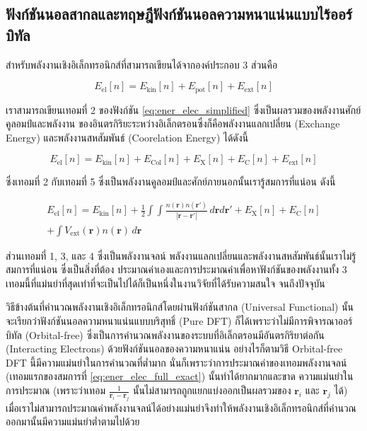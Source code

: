 \subsection{ฟังก์ชันนอลสากลและทฤษฎีฟังก์ชันนอลความหนาแน่นแบบไร้ออร์บิทัล}
\label{ssec:univer_functional}

สำหรับพลังงานเชิงอิเล็กทรอนิกส์ที่สามารถเขียนได้จากองค์ประกอบ 3 ส่วนคือ

\begin{equation}\label{eq:ener_elec_simplified}
    E_{\text{el}}[n] = E_{\text{kin}}[n] + E_{\text{pot}}[n] + E_{\text{ext}}[n]
\end{equation}

\noindent เราสามารถเขียนเทอมที่ 2 ของฟังก์ชัน \ref{eq:ener_elec_simplified} ซึ่งเป็นผลรวมของพลังงานศักย์คูลอมป์และพลังงาน%
ของอินตรกิริยะระหว่างอิเล็กตรอนซึ่งก็คือพลังงานแลกเปลี่ยน (Exchange Energy) และพลังงานสหสัมพันธ์ (Coorelation Energy) ได้ดังนี้

\begin{equation}\label{eq:ener_elec_full}
    E_{\text{el}}[n] = E_{\text{kin}}[n] + E_{\text{Col}}[n] + E_{\text{X}}[n] + E_{\text{C}}[n] + 
    E_{\text{ext}}[n]
\end{equation}

\noindent ซึ่งเทอมที่ 2 กับเทอมที่ 5 ซึ่งเป็นพลังงานคูลอมป์และศักย์ภายนอกนั้นเรารู้สมการที่แน่อน ดังนี้

\begin{multline}\label{eq:ener_elec_full_exact}
    E_{\text{el}}[n] = E_{\text{kin}}[n] + \frac{1}{2} \int \int \frac{n(\bm{r})n(\bm{r'})}{|\bm{r}-\bm{r'}|} 
    \, d\bm{r} d\bm{r'} + E_{\text{X}}[n] + E_{\text{C}}[n] \\ 
    + \int V_{\text{ext}}(\bm{r}) n(\bm{r}) \, d\bm{r}
\end{multline}

\noindent ส่วนเทอมที่ 1, 3, และ 4 ซึ่งเป็นพลังงานจลน์ พลังงานแลกเปลี่ยนและพลังงานสหสัมพันธ์นั้นเราไม่รู้สมการที่แน่อน ซึ่งเป็นสิ่งที่ต้อง%
ประมาณค่าเองและการประมาณค่าเพื่อหาฟังก์ชันของพลังงานทั้ง 3 เทอมนี้ที่แม่นยำที่สุดเท่าที่จะเป็นไปได้ก็เป็นหนึ่งในงานวิจัยที่ได้รับความสนใจ%
จนถึงปัจจุบัน

วิธีข้างต้นที่คำนวณพลังงานเชิงอิเล็กทรอนิกส์โดยผ่านฟังก์ชันสากล (Universal Functional) นั้นจะเรียกว่าฟังก์ชันนอลความหนาแน่นแบบบริสุทธิ์ 
(Pure DFT) ก็ได้เพราะว่าไม่มีการพิจารณาออร์บิทัล (Orbital-free) ซึ่งเป็นการคำนวณพลังงานของระบบที่อิเล็กตรอนมีอันตรกิริยาต่อกัน 
(Interacting Electrons) ด้วยฟังก์ชันนอลของความหนาแน่น อย่างไรก็ตามวิธี Orbital-free DFT นี้มีความแม่นยำในการคำนวณที่ต่ำมาก%
นั่นก็เพราะว่าการประมาณค่าของเทอมพลังงานจลน์ (เทอมแรกของสมการที่ \ref{eq:ener_elec_full_exact}) นั้นทำได้ยากมากและขาด%
ความแม่นยำในการประมาณ (เพราะว่าเทอม $\frac{1}{\bm{r}_{i}-\bm{r}_{j}}$ นั้นไม่สามารถถูกแยกแบ่งออกเป็นผลรวมของ 
$\bm{r}_{i}$ และ $\bm{r}_{j}$ ได้)  เมื่อเราไม่สามารถประมาณค่าพลังงานจลน์ได้อย่างแม่นยำจึงทำให้พลังงานเชิงอิเล็กทรอนิกส์ที่คำนวณ%
ออกมานั้นมีความแม่นยำต่ำตามไปด้วย

